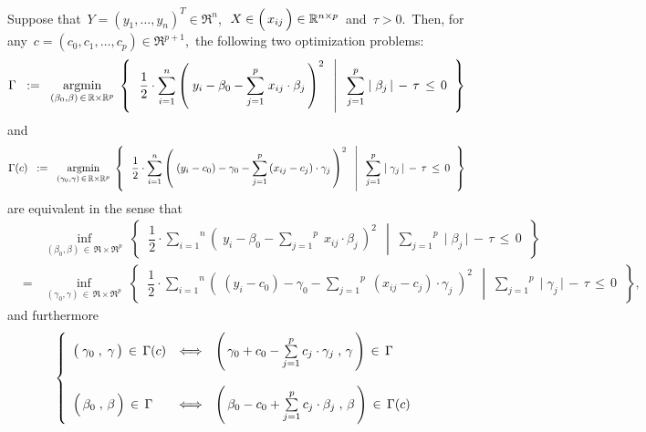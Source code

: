 \vskip 0.5cm
\begin{proposition}
\label{translationsYieldEquivalent}
\mbox{}
\vskip 0.0cm
\noindent
Suppose that
\,$Y = (y_{1},\ldots,y_{n})^{T} \in \Re^{n}$,\,
\,$X \in \left(\,\overset{{\color{white}-}}{x_{ij}}\,\right)\in\Re^{n \times p}$\, and
\,$\tau > 0$.\,
Then, for any
\,$c = (c_{0},c_{1},\ldots,c_{p}) \in \Re^{p+1}$,\,
the following two optimization problems:
\begin{equation*}
\Gamma
\;\; := \;\;
	\underset{(\beta_{0},\beta)\,\in\,\mathbb{R}\times\mathbb{R}^{p}}{\textnormal{argmin}}\;
	\left\{\;\;
		\left.
		\dfrac{1}{2}
		\cdot
		\overset{n}{\underset{i=1}{\sum}}
		\left(\; y_{i} - \beta_{0} - \overset{p}{\underset{j=1}{\sum}}\; x_{ij}\cdot\beta_{j}\,\right)^{2}
		\;\;\,\right\vert\;\;
		\overset{p}{\underset{j=1}{\sum}}\;
		\vert\;\beta_{j}\,\vert
		\, - \,
		\tau \, \leq \, 0
		\;\;\right\}
\end{equation*}
and
\begin{equation*}
\Gamma(c)
\;\; := \;\;
	\underset{(\gamma_{0},\gamma)\,\in\,\mathbb{R}\times\mathbb{R}^{p}}{\textnormal{argmin}}\;
	\left\{\;\;
		\left.
		\dfrac{1}{2}
		\cdot
		\overset{n}{\underset{i=1}{\sum}}
		\left(\; (y_{i} - c_{0}) - \gamma_{0} - \overset{p}{\underset{j=1}{\sum}}\, (x_{ij}-c_{j})\cdot\gamma_{j}\,\right)^{2}
		\;\;\,\right\vert\;\;
		\overset{p}{\underset{j=1}{\sum}}\;
		\vert\;\gamma_{j}\,\vert
		\, - \,
		\tau \, \leq \, 0
		\;\;\right\}
\end{equation*}
are equivalent in the sense that
\begin{eqnarray*}
&&
	\underset{(\beta_{0},\beta)\,\in\,\Re\times\Re^{p}}{\inf}\;
	\left\{\;\;
		\left.
		\dfrac{1}{2}
		\cdot
		\overset{n}{\underset{i=1}{\sum}}
		\left(\; y_{i} - \beta_{0} - \overset{p}{\underset{j=1}{\sum}}\; x_{ij}\cdot\beta_{j}\,\right)^{2}
		\;\;\,\right\vert\;\;
		\overset{p}{\underset{j=1}{\sum}}\;
		\vert\;\beta_{j}\,\vert
		\, - \,
		\tau \, \leq \, 0
		\;\;\right\}
\\
& = &
	\underset{(\gamma_{0},\gamma)\,\in\,\Re\times\Re^{p}}{\inf}\;
	\left\{\;\;
		\left.
		\dfrac{1}{2}
		\cdot
		\overset{n}{\underset{i=1}{\sum}}
		\left(\; (y_{i} - c_{0}) - \gamma_{0} - \overset{p}{\underset{j=1}{\sum}}\; (x_{ij}-c_{j})\cdot\gamma_{j}\;\right)^{2}
		\;\;\,\right\vert\;\;
		\overset{p}{\underset{j=1}{\sum}}\;
		\vert\;\gamma_{j}\,\vert
		\, - \,
		\tau \, \leq \, 0
		\;\;\right\},
\end{eqnarray*}
and furthermore
\begin{equation*}
\left\{\begin{array}{lcl}
	\left(\;\overset{{\color{white}.}}{\gamma_{0}}\;,\;\gamma\,\right) \,\in\, \Gamma(c)
	&\Longleftrightarrow&
	\left(\,\gamma_{0}+c_{0}-\overset{p}{\underset{j=1}{\sum}}\,c_{j}\cdot\gamma_{j}\;,\,\gamma\,\right) \,\in\, \Gamma
	\\ \\
	\left(\,\overset{{\color{white}.}}{\beta_{0}}\;,\,\beta\,\right) \,\in\, \Gamma
	&\Longleftrightarrow&
	\left(\,\beta_{0}-c_{0}+\overset{p}{\underset{j=1}{\sum}}\,c_{j}\cdot\beta_{j}\;,\,\beta\,\right) \,\in\, \Gamma(c)
\end{array}\right.
\end{equation*}
\end{proposition}
